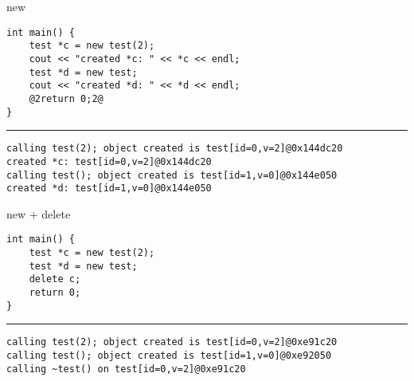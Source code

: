 \begin{frame}[fragile,label=testnew]{new}
\begin{lstlisting}
int main() {
    test *c = new test(2);
    cout << "created *c: " << *c << endl;
    test *d = new test;
    cout << "created *d: " << *d << endl;
    @2return 0;2@
}
\end{lstlisting}
\hrule
{}
\begin{lstlisting}
calling test(2); object created is test[id=0,v=2]@0x144dc20
created *c: test[id=0,v=2]@0x144dc20
calling test(); object created is test[id=1,v=0]@0x144e050
created *d: test[id=1,v=0]@0x144e050
\end{lstlisting}
\end{frame}

\begin{frame}[fragile,label=testnewDel]{new + delete}
\begin{lstlisting}
int main() {
    test *c = new test(2);
    test *d = new test;
    delete c;
    return 0;
}
\end{lstlisting}
\hrule
{}
\begin{lstlisting}
calling test(2); object created is test[id=0,v=2]@0xe91c20
calling test(); object created is test[id=1,v=0]@0xe92050
calling ~test() on test[id=0,v=2]@0xe91c20
\end{lstlisting}
\end{frame}



